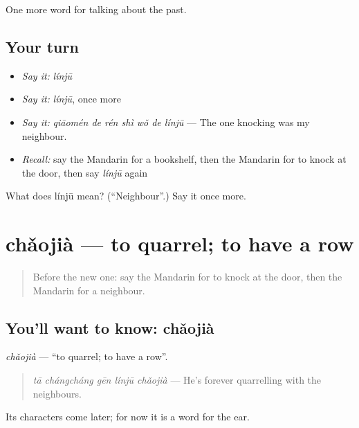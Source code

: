 \begin{grammarlens}[title={What you've built}]
One more word for talking about the past.
\end{grammarlens}

\subsection*{Your turn}
\begin{itemize}
\raggedright
  \item \emph{Say it:} \emph{línjū}
  \item \emph{Say it:} \emph{línjū}, once more
  \item \emph{Say it:} \emph{qiāomén de rén shì wǒ de línjū} — The one knocking was my neighbour.
  \item \emph{Recall:} say the Mandarin for a bookshelf, then the Mandarin for to knock at the door, then say \emph{línjū} again
\end{itemize}

\begin{tcolorbox}[breakable,colback=teal!4,colframe=teal!35!black,title={Before you move on}]
What does línjū mean? (\textquotedblleft{}Neighbour\textquotedblright{}.) Say it once more.
\end{tcolorbox}
\section[chǎojià]{chǎojià — to quarrel; to have a row}

\label{lesson:ZH-C176-chaojia}



\begin{quote}
Before the new one: say the Mandarin for to knock at the door, then the Mandarin for a neighbour.
\end{quote}

\subsection*{You'll want to know: chǎojià}
\emph{chǎojià} — \textquotedblleft{}to quarrel; to have a row\textquotedblright{}.

\begin{quote}
\emph{tā chángcháng gēn línjū chǎojià} — He's forever quarrelling with the neighbours.
\end{quote}

Its characters come later; for now it is a word for the ear.

